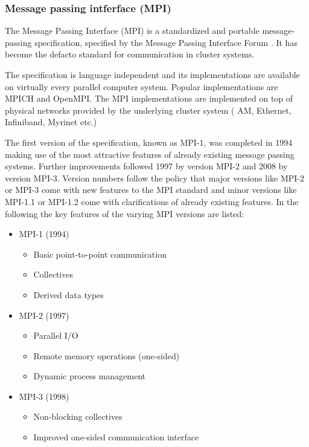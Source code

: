 \subsubsection{Message passing intferface (MPI)}
\label{sec:mpi}
The Message Passing Interface (MPI) is a standardized and portable
message-passing specification, specified by the Message Passing
Interface Forum \cite{ref:mpi_specification}. It has become the defacto standard for communication in cluster systems.

The specification is language independent and its implementations are
available on virtually every parallel computer system.  Popular
implementations are MPICH and OpenMPI.  The MPI implementations are
implemented on top of physical networks provided by the underlying
cluster system ( AM, Ethernet, Infiniband, Myrinet etc.)

The first version of the specification, known as MPI-1, was completed
in 1994 making use of the most attractive features of already
existing message passing systems.  Further improvements followed 1997
by version MPI-2 and 2008 by version MPI-3. Version numbers follow
the policy that major versions like MPI-2 or MPI-3 come with new
features to the MPI standard and minor versions like MPI-1.1 or
MPI-1.2 come with clarifications of already existing features. In
the following the key features of the varying MPI versions are listed:

\begin{itemize}
  \item MPI-1 (1994)
    \begin{itemize}
      \item Basic point-to-point communication
      \item Collectives
      \item Derived data types
    \end{itemize}
  \item MPI-2 (1997)
    \begin{itemize}
      \item Parallel I/O
      \item Remote memory operations (one-sided)
      \item Dynamic process management
    \end{itemize}
  \item MPI-3 (1998)
    \begin{itemize}
      \item Non-blocking collectives
      \item Improved one-sided communication interface
    \end{itemize}
\end{itemize}

